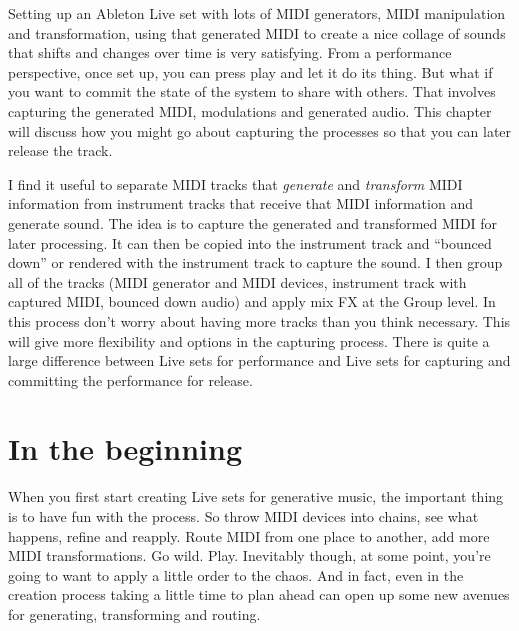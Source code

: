 \documentclass[
  12pt,
  letterpaper,
  oneside,
  open=any]{scrbook}
\begin{document}
Setting up an Ableton Live set with lots of MIDI generators, MIDI
manipulation and transformation, using that generated MIDI to create a
nice collage of sounds that shifts and changes over time is very
satisfying. From a performance perspective, once set up, you can press
play and let it do its thing. But what if you want to commit the state
of the system to share with others. That involves capturing the
generated MIDI, modulations and generated audio. This chapter will
discuss how you might go about capturing the processes so that you can
later release the track.

\begin{tcolorbox}[enhanced jigsaw, toprule=.15mm, leftrule=.75mm, coltitle=black, bottomtitle=1mm, colbacktitle=quarto-callout-tip-color!10!white, bottomrule=.15mm, opacityback=0, colback=white, arc=.35mm, colframe=quarto-callout-tip-color-frame, opacitybacktitle=0.6, toptitle=1mm, titlerule=0mm, rightrule=.15mm, title=\textcolor{quarto-callout-tip-color}{\faLightbulb}\hspace{0.5em}{Key idea}, left=2mm, breakable]

I find it useful to separate MIDI tracks that \emph{generate} and
\emph{transform} MIDI information from instrument tracks that receive
that MIDI information and generate sound. The idea is to capture the
generated and transformed MIDI for later processing. It can then be
copied into the instrument track and ``bounced down'' or rendered with
the instrument track to capture the sound. I then group all of the
tracks (MIDI generator and MIDI devices, instrument track with captured
MIDI, bounced down audio) and apply mix FX at the Group level. In this
process don't worry about having more tracks than you think necessary.
This will give more flexibility and options in the capturing process.
There is quite a large difference between Live sets for performance and
Live sets for capturing and committing the performance for release.

\end{tcolorbox}

\section{In the beginning}\label{in-the-beginning}

When you first start creating Live sets for generative music, the
important thing is to have fun with the process. So throw MIDI devices
into chains, see what happens, refine and reapply. Route MIDI from one
place to another, add more MIDI transformations. Go wild. Play.
Inevitably though, at some point, you're going to want to apply a little
order to the chaos. And in fact, even in the creation process taking a
little time to plan ahead can open up some new avenues for generating,
transforming and routing.
\end{document}
